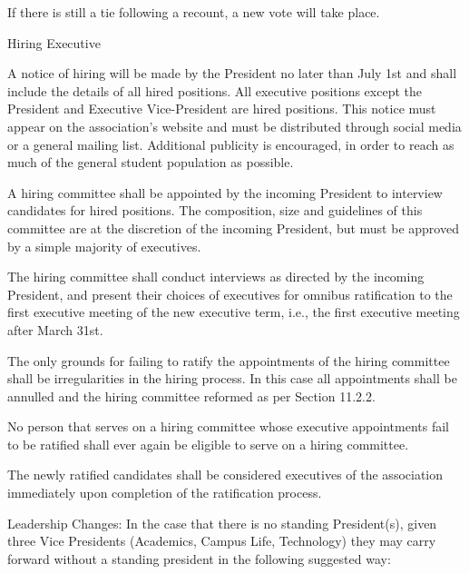 \documentclass[12pt,a4paper]{article}
\begin{document}
\begin{constitutionlist}
\begin{constitutionlist}
\begin{constitutionlist}
\item If there is still a tie following a recount, a new vote will take place.
\end{constitutionlist}
\end{constitutionlist}

\item Hiring Executive

\begin{constitutionlist}
\item A notice of hiring will be made by the President no later than July 1st and shall include the details of all hired positions. All executive positions except the President and Executive Vice-President are hired positions. This notice must appear on the association's website and must be distributed through social media or a general mailing list. Additional publicity is encouraged, in order to reach as much of the general student population as possible.

\item A hiring committee shall be appointed by the incoming President to interview candidates for hired positions. The composition, size and guidelines of this committee are at the discretion of the incoming President, but must be approved by a simple majority of executives.

\item The hiring committee shall conduct interviews as directed by the incoming President, and present their choices of executives for omnibus ratification to the first executive meeting of the new executive term, i.e., the first executive meeting after March 31st.

\item The only grounds for failing to ratify the appointments of the hiring committee shall be irregularities in the hiring process. In this case all appointments shall be annulled and the hiring committee reformed as per Section 11.2.2.

\item No person that serves on a hiring committee whose executive appointments fail to be ratified shall ever again be eligible to serve on a hiring committee.

\item The newly ratified candidates shall be considered executives of the association immediately upon completion of the ratification process.
\end{constitutionlist}

\item Leadership Changes: In the case that there is no standing President(s), given three Vice Presidents (Academics, Campus Life, Technology) they may carry forward without a standing president in the following suggested way:


\end{constitutionlist}
\end{document}
